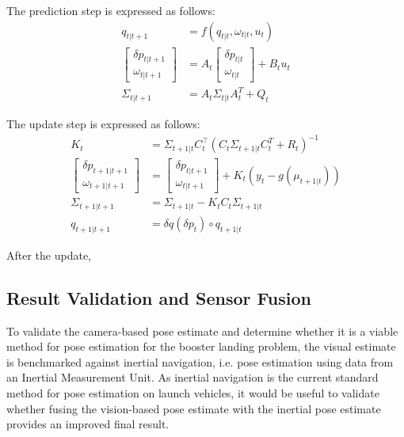 \documentclass[conference]{IEEEtran}
\begin{document}
The prediction step is expressed as follows:
%
\begin{align*}
    q_{t|t+1} & = f(q_{t|t}, \omega_{t|t}, u_t) \\
     \begin{bmatrix}
         \delta p_{t|t+1} \\ \omega_{t|t+1}
     \end{bmatrix} 
     & = A_{t} 
     \begin{bmatrix}
         \delta p_{t|t} \\ \omega_{t|t}
     \end{bmatrix} + B_t u_t  \\
    \Sigma_{t|t+1} & = A_t \Sigma_{t|t} A_t^T + Q_t 
\end{align*}

The update step is expressed as follows:
%
\begin{align*}
    K_t & =  \Sigma_{t+1|t} C_t^\top (C_t \Sigma_{t+1|t} C_t^T + R_t)^{-1} \\
    \begin{bmatrix}
         \delta p_{t+1|t+1} \\ \omega_{t+1|t+1}
     \end{bmatrix}
     & = 
     \begin{bmatrix}
         \delta p_{t|t+1} \\ \omega_{t|t+1}
     \end{bmatrix} + K_t \left(y_t - g\left(\mu_{t+1|t} \right) \right) 
     \\
     \Sigma_{t+1|t+1} & = \Sigma_{t+1|t} - K_t C_t  \Sigma_{t+1|t}  \\
    q_{t+1|t+1} & = \delta q(\delta p_{t}) \circ q_{t+1|t}
\end{align*}

After the update, 

\subsection{Result Validation and Sensor Fusion}
To validate the camera-based pose estimate and determine whether it is a viable method for pose estimation for the booster landing problem, the visual estimate is benchmarked against inertial navigation, i.e. pose estimation using data from an Inertial Measurement Unit. 
As inertial navigation is the current standard method for pose estimation on launch vehicles, it would be useful to validate whether fusing the vision-based pose estimate with the inertial pose estimate provides an improved final result. 
\end{document}
